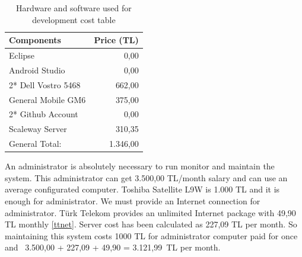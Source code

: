 \begin{table}[!h!]
\centering
\caption{Hardware and software used for development cost table}
\label{tab:hardsoftcost}
\begin{tabular}{|l|r|}
\hline
\textbf{Components}             & \multicolumn{1}{l|}{\textbf{Price (TL)}} \\ \hline
Eclipse \cite{eclipse} & 0,00 \\ \hline
Android Studio \cite{androidStudio} & 0,00 \\ \hline
2* Dell Vostro 5468 \cite{dell} & 662,00 \\ \hline
General Mobile GM6 \cite{gm6} & 375,00                            \\ \hline
2* Github Account                  & 0,00                            \\ \hline
Scaleway Server                  & 310,35                           \\ \hline
General Total:                  & 1.346,00                            \\ \hline
\end{tabular}
\end{table}

An administrator is absolutely necessary to run monitor and maintain the system. This administrator can get 3.500,00 TL/month salary and can use an average configurated computer. Toshiba Satellite L9W \cite{toshiba} is 1.000 TL and it is enough for administrator. We must provide an Internet connection for administrator. Türk Telekom provides an unlimited Internet package with 49,90 TL monthly \ref{ttnet}. Server cost has been calculated as 227,09 TL per month. So maintaining this system costs 1000 TL for administrator computer paid for once and \ 3.500,00 + 227,09 + 49,90 = 3.121,99\ TL per month.